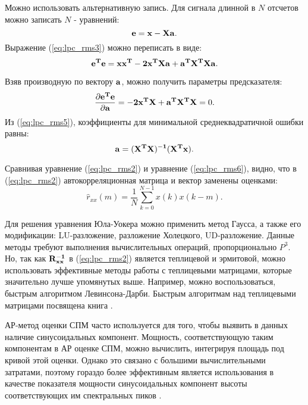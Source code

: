 Можно использовать альтернативную запись.  Для сигнала длинной в ${N}$ отсчетов можно записать ${N}$ - уравнений:
\begin{equation}
	\label{eq:lpc_rms3}
	{\bf e=x-Xa}.
\end{equation}
Выражение (\ref{eq:lpc_rms3}) можно переписать в виде:
\begin{equation}
	\label{eq:lpc_rms4}
	{\bf e^T e = xx^T - 2x^T Xa + a^T X^T Xa}.
\end{equation}

Взяв производную по вектору ${{\bf a}}$, можно получить параметры предсказателя:
\begin{equation}
	\label{eq:lpc_rms5}
	\frac{\partial {\bf e^T e}}{\partial {\bf a}} = {\bf - 2x^T X + a^T X^T X} = 0.
\end{equation}
Из (\ref{eq:lpc_rms5}), коэффициенты для минимальной среднеквадратичной ошибки равны:
\begin{equation}
	\label{eq:lpc_rms6}
	{\bf a= (X^T X)^{-1} (X^T x)}.
\end{equation}

Сравнивая уравнение (\ref{eq:lpc_rms2}) и уравнение (\ref{eq:lpc_rms6}), видно, что в (\ref{eq:lpc_rms2})
автокорреляционная матрица и вектор заменены оценками:
\begin{equation}
	\label{eq:lpc_rxx_estimation}
	\hat{r}_{xx}(m) = \frac{1}{N} \sum \limits_{k=0}^{N-1} x(k)x(k-m).
\end{equation}

Для решения уравнения Юла-Уокера можно применить метод Гаусса, а также его модификации: LU-разложение,
разложение Холецкого, UD-разложение. Данные методы требуют выполнения вычислительных операций, пропорционально ${P^3}$.
Но, так как ${\bf{R^{-1}_{xx}}}$ в (\ref{eq:lpc_rms2}) является теплицевой и эрмитовой, можно использовать эффективные методы работы
с теплицевыми матрицами, которые значительно лучше упомянутых выше. 
Например, можно воспользоваться, быстрым алгоритмом Левинсона-Дарби.
Быстрым алгоритмам над теплицевыми матрицами посвящена книга \cite{bleyhut_book}.

АР-метод оценки СПМ часто используется для того, чтобы выявить в данных наличие синусоидальных
компонент. Мощность, соответствующую  таким компонентам в АР оценке СПМ, можно вычислить, интегрируя
площадь под кривой этой оценки. Однако это связано с большими вычислительными затратами, поэтому
гораздо более эффективным является использования в качестве показателя мощности синусоидальных
компонент высоты соответствующих им спектральных пиков \cite{marpl_book}.  

